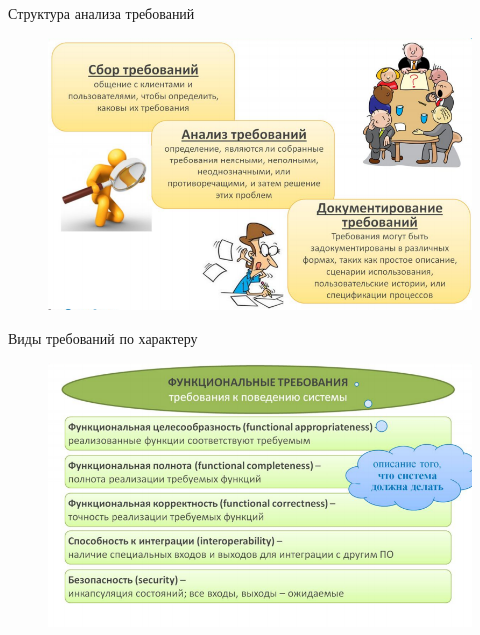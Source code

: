 \documentclass{beamer}
\begin{document}
\begin{frame}[t]{Структура анализа требований}
\begin{figure}[h]
\centering
\includegraphics[scale=0.5]{images/lec02-pic08.png}
\end{figure}
\end{frame}

\begin{frame}[t]{Виды требований по характеру}
\begin{figure}[h]
\centering
\includegraphics[scale=0.5]{images/lec02-pic09.png}
\end{figure}
\end{frame}    
\end{document}
